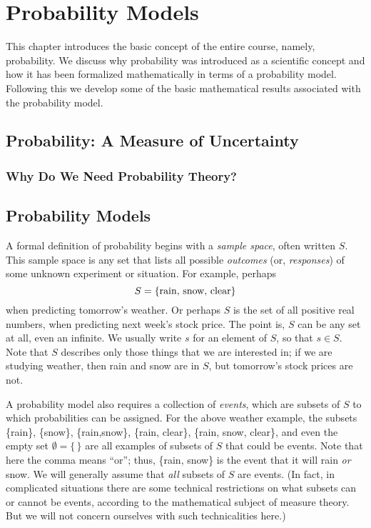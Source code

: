 \chapter{Probability Models}\label{chap:probability_models}
\minitoc
This chapter introduces the basic concept of the entire course, namely, probability. We discuss why probability was introduced as a scientific concept and how it has been formalized mathematically in terms of a probability model. Following this we develop some of the basic mathematical results associated with the probability model.

\section{Probability: A Measure of Uncertainty}
\lipsum[1-10]

\subsection{Why Do We Need Probability Theory?}
\lipsum[1-10]

\section{Probability Models}
A formal definition of probability begins with a \emph{sample space}, often written  $S$. This sample space is any set that lists all possible \emph{outcomes} (or, \emph{responses}) of some unknown experiment or situation. For example, perhaps
\begin{equation}
    S =  \text{\{rain, snow, clear\}} \notag
\end{equation}
when predicting tomorrow's weather. Or perhaps $S$ is the set of all positive real numbers, when predicting next week's stock price. The point is, $S$ can be any set at all, even an infinite. We usually write $s$ for an element of $S$, so that $s \in S$. Note that $S$ describes only those things that we are interested in; if we are studying weather, then rain and snow are in $S$, but tomorrow's stock prices are not.

A probability model also requires a collection of \emph{events}, which are subsets of $S$ to which  probabilities can be assigned. For the above weather example, the subsets \{rain\}, \{snow\}, \{rain,snow\}, \{rain, clear\}, \{rain, snow, clear\}, and even the empty set $\emptyset = \{\,\}$ are all examples of subsets of $S$ that could be events. Note that here the comma means ``or''; thus, \{rain, snow\} is the event that it will rain \emph{or} snow. We will generally assume that \emph{all} subsets of $S$ are events. (In fact, in complicated situations there are some technical restrictions on what subsets can or cannot be events, according to the mathematical subject of measure theory. But we will not concern ourselves with such technicalities here.)

